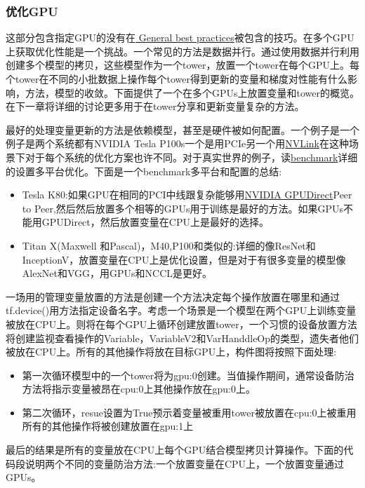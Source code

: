 \subsubsection{优化GPU}
这部分包含指定GPU的没有在\href{https://www.tensorflow.org/performance/performance_guide#general_best_practices}{ General best practices}被包含的技巧。在多个GPU上获取优化性能是一个挑战。一个常见的方法是数据并行。通过使用数据并行利用创建多个模型的拷贝，这些模型作为一个tower，放置一个tower在每个GPU上。每个tower在不同的小批数据上操作每个tower得到更新的变量和梯度对性能有什么影响，方法，模型的收敛。下面提供了一个在多个GPUs上放置变量和tower的概览。在下一章将详细的讨论更多用于在tower分享和更新变量复杂的方法。

最好的处理变量更新的方法是依赖模型，甚至是硬件被如何配置。一个例子是一个例子是两个系统都有NVIDIA Tesla P100s一个是用PCIe另一个用\href{http://www.nvidia.com/object/nvlink.html}{NVLink}在这种场景下对于每个系统的优化方案也许不同。对于真实世界的例子，读\href{https://www.tensorflow.org/performance/benchmarks}{benchmark}详细的设置多平台优化。下面是一个benchmark多平台和配置的总结:
\begin{itemize}
	\item Tesla K80:如果GPU在相同的PCI中线跟复杂能够用\href{https://developer.nvidia.com/gpudirect}{NVIDIA GPUDirect}Peer to Peer,然后然后放置多个相等的GPUs用于训练是最好的方法。如果GPUs不能用GPUDirect，然后放置变量在CPU上是最好的选择。
	\item Titan X(Maxwell 和Pascal)，M40,P100和类似的:详细的像ResNet和InceptionV，放置变量在CPU上是优化设置，但是对于有很多变量的模型像AlexNet和VGG，用GPUs和NCCL是更好。
\end{itemize}
一场用的管理变量放置的方法是创建一个方法决定每个操作放置在哪里和通过tf.device()用方法指定设备名字。考虑一个场景是一个模型在两个GPU上训练变量被放在CPU上。则将在每个GPU上循环创建放置tower，一个习惯的设备放置方法将创建监视查看操作的Variable，VariableV2和VarHanddleOp的类型，遗失者他们被放在CPU上。所有的其他操作将放在目标GPU上，构件图将按照下面处理:
\begin{itemize}
	\item 第一次循环模型中的一个tower将为gpu:0创建。当值操作期间，通常设备防治方法将指示变量被昂在cpu:0上其他操作放在gpu:0上。
	\item 第二次循环，resue设置为True预示着变量被重用tower被放置在cpu:0上被重用所有的其他操作将被创建放置在gpu:1上
\end{itemize}
最后的结果是所有的变量放在CPU上每个GPU结合模型拷贝计算操作。下面的代码段说明两个不同的变量防治方法:一个放置变量在CPU上，一个放置变量通过GPUs。
